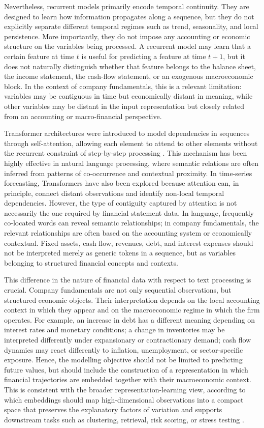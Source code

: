 \documentclass[a4paper,fleqn]{cas-dc}
\begin{document}
Nevertheless, recurrent models primarily encode temporal continuity. They are designed to learn how information propagates along a sequence, but they do not explicitly separate different temporal regimes such as trend, seasonality, and local persistence. More importantly, they do not impose any accounting or economic structure on the variables being processed. A recurrent model may learn that a certain feature at time \(t\) is useful for predicting a feature at time \(t+1\), but it does not naturally distinguish whether that feature belongs to the balance sheet, the income statement, the cash-flow statement, or an exogenous macroeconomic block. In the context of company fundamentals, this is a relevant limitation: variables may be contiguous in time but economically distant in meaning, while other variables may be distant in the input representation but closely related from an accounting or macro-financial perspective.

Transformer architectures were introduced to model dependencies in sequences through self-attention, allowing each element to attend to other elements without the recurrent constraint of step-by-step processing \citep{vaswani2017attention}. This mechanism has been highly effective in natural language processing, where semantic relations are often inferred from patterns of co-occurrence and contextual proximity. In time-series forecasting, Transformers have also been explored because attention can, in principle, connect distant observations and identify non-local temporal dependencies. However, the type of contiguity captured by attention is not necessarily the one required by financial statement data. In language, frequently co-located words can reveal semantic relationships; in company fundamentals, the relevant relationships are often based on the accounting system or economically contextual. Fixed assets, cash flow, revenues, debt, and interest expenses should not be interpreted merely as generic tokens in a sequence, but as variables belonging to structured financial concepts and contexts.

This difference in the nature of financial data with respect to text processing is crucial. Company fundamentals are not only sequential observations, but structured economic objects. Their interpretation depends on the local accounting context in which they appear and on the macroeconomic regime in which the firm operates. For example, an increase in debt has a different meaning depending on interest rates and monetary conditions; a change in inventories may be interpreted differently under expansionary or contractionary demand; cash
 flow dynamics may react differently to inflation, unemployment, or sector-specific exposure. Hence, the modelling objective should not be limited to predicting future values, but should include the construction of a representation in which financial trajectories are embedded together with their macroeconomic context. This is consistent with the broader representation-learning view, according to which embeddings should map high-dimensional observations into a compact space that preserves the explanatory factors of variation and supports downstream tasks such as clustering, retrieval, risk scoring, or stress testing \citep{Bengio2013}.
\end{document}
